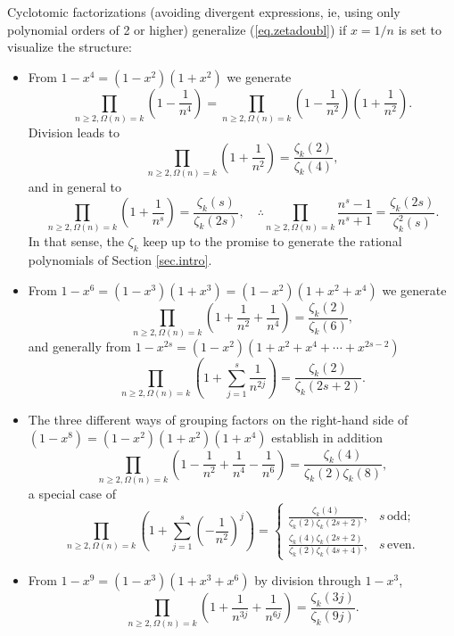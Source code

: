 \documentclass{amsart}
\begin{document}
Cyclotomic factorizations (avoiding divergent expressions,  ie,
using only polynomial orders of 2 or higher) generalize (\ref{eq.zetadoubl})
if $x=1/n$ is set to visualize the structure:
\begin{itemize}
\item
From $1-x^4=(1-x^2)(1+x^2)$ we generate
\begin{equation}
\prod_{n\ge 2,\Omega(n)=k} \left(1-\frac{1}{n^4}\right) =
\prod_{n\ge 2,\Omega(n)=k} \left(1-\frac{1}{n^2}\right)
\left(1+\frac{1}{n^2}\right)
.
\end{equation}
Division leads to
\begin{equation}
\prod_{n\ge 2,\Omega(n)=k}
\left(1+\frac{1}{n^2}\right)
=\frac{\zeta_k(2)}{\zeta_k(4)}
,
\end{equation}
and in general to
\begin{equation}
\prod_{n\ge 2,\Omega(n)=k}
\left(1+\frac{1}{n^s}\right)
=\frac{\zeta_k(s)}{\zeta_k(2s)}
,
\quad
\therefore
\prod_{n\ge 2,\Omega(n)=k}
\frac{n^s-1}{n^s+1}
=\frac{\zeta_k(2s)}{\zeta_k^2(s)}
.
\label{eq.Zofzeta2}
\end{equation}
In that sense, the $\zeta_k$ keep up to the promise to generate the rational
polynomials of Section \ref{sec.intro}.
\item
From $1-x^6=(1-x^3)(1+x^3)=(1-x^2)(1+x^2+x^4)$ we generate
\begin{equation}
\prod_{n\ge 2,\Omega(n)=k}
\left(1+\frac{1}{n^2}+\frac{1}{n^4}\right)
=\frac{\zeta_k(2)}{\zeta_k(6)}
,
\end{equation}
and generally from $1-x^{2s}=(1-x^2)(1+x^2+x^4+\cdots +x^{2s-2})$ 
\begin{equation}
\prod_{n\ge 2,\Omega(n)=k}
\left(1+\sum_{j=1}^s \frac{1}{n^{2j}}\right)
=\frac{\zeta_k(2)}{\zeta_k(2s+2)}
.
\end{equation}

\item
The three different ways of grouping factors
on the right-hand side of $(1-x^8)=(1-x^2)(1+x^2)(1+x^4)$ establish in addition
\begin{equation}
\prod_{n\ge 2,\Omega(n)=k}
\left(1-\frac{1}{n^2}+\frac{1}{n^4}-\frac{1}{n^6}\right)
=\frac{\zeta_k(4)}{\zeta_k(2)\zeta_k(8)}
,
\end{equation}
a special case of
\begin{equation}
\prod_{n\ge 2,\Omega(n)=k}
\left(1+\sum_{j=1}^s \left(-\frac{1}{n^2}\right)^j\right)
=\left\{
\begin{array}{ll}
\displaystyle \frac{\zeta_k(4)}{\zeta_k(2) \zeta_k(2s+2)}
  ,& s\, \mathrm{odd}; \\
\displaystyle \frac{\zeta_k(4)\zeta_k(2s+2)}{\zeta_k(2) \zeta_k(4s+4)}
  ,& s\, \mathrm{even}.
\end{array}
\right.
\end{equation}
\item
From $1-x^9=(1-x^3)(1+x^3+x^6)$  by division through $1-x^3$,
\begin{equation}
\prod_{n\ge 2,\Omega(n)=k}
\left(1+\frac{1}{n^{3j}}+\frac{1}{n^{6j}}\right)
=\frac{\zeta_k(3j)}{\zeta_k(9j)}
.
\end{equation}
\end{itemize}
\end{document}

